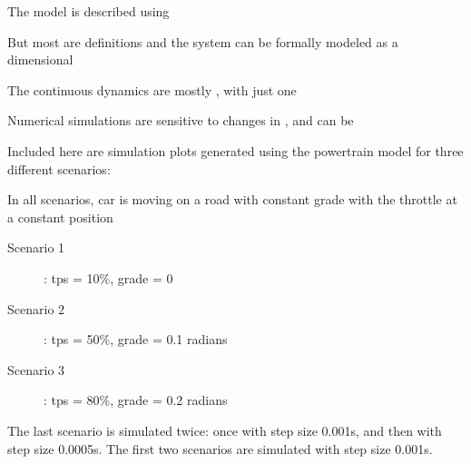 \documentclass{seminar}
\begin{document}
\begin{slide}

The model is described using {}

\medskip
But most are definitions and the system can be formally
modeled as a {} dimensional {}

\medskip
The continuous dynamics are mostly {}, with just one
{}

\bigskip
Numerical simulations are sensitive to changes in {},
and can be {}

\end{slide}
\begin{slide}

Included here are simulation plots generated using the
powertrain model for three different scenarios:

In all scenarios, car is moving on a road with constant
grade with the throttle at a constant position

\begin{description}
\item[Scenario 1]: tps = 10\%, grade = 0
\item[Scenario 2]: tps = 50\%, grade = 0.1 radians
\item[Scenario 3]: tps = 80\%, grade = 0.2 radians
\end{description}

The last scenario is simulated twice:
once with step size 0.001s, and then with step size 0.0005s.
The first two scenarios are simulated with step size 0.001s.

\end{slide}
\end{document}
